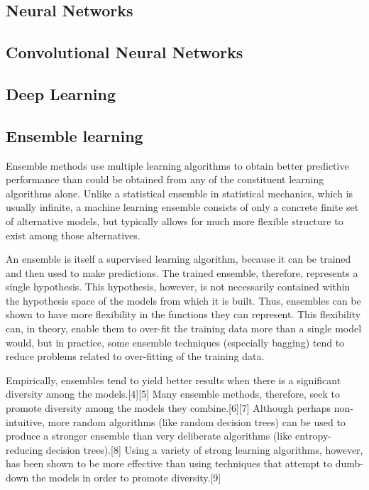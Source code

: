 \documentclass[12pt]{article}
\numberwithin{equation}{section}
\numberwithin{table}{section}
\numberwithin{figure}{section}
\begin{document}
\subsection{Neural Networks}



\subsection{Convolutional Neural Networks}


\subsection{Deep Learning}

\subsection{Ensemble learning}
Ensemble methods use multiple learning algorithms to obtain better predictive performance than could be obtained from any of the constituent learning algorithms alone. Unlike a statistical ensemble in statistical mechanics, which is usually infinite, a machine learning ensemble consists of only a concrete finite set of alternative models, but typically allows for much more flexible structure to exist among those alternatives.

An ensemble is itself a supervised learning algorithm, because it can be trained and then used to make predictions. The trained ensemble, therefore, represents a single hypothesis. This hypothesis, however, is not necessarily contained within the hypothesis space of the models from which it is built. Thus, ensembles can be shown to have more flexibility in the functions they can represent. This flexibility can, in theory, enable them to over-fit the training data more than a single model would, but in practice, some ensemble techniques (especially bagging) tend to reduce problems related to over-fitting of the training data.

Empirically, ensembles tend to yield better results when there is a significant diversity among the models.[4][5] Many ensemble methods, therefore, seek to promote diversity among the models they combine.[6][7] Although perhaps non-intuitive, more random algorithms (like random decision trees) can be used to produce a stronger ensemble than very deliberate algorithms (like entropy-reducing decision trees).[8] Using a variety of strong learning algorithms, however, has been shown to be more effective than using techniques that attempt to dumb-down the models in order to promote diversity.[9]
\end{document}
